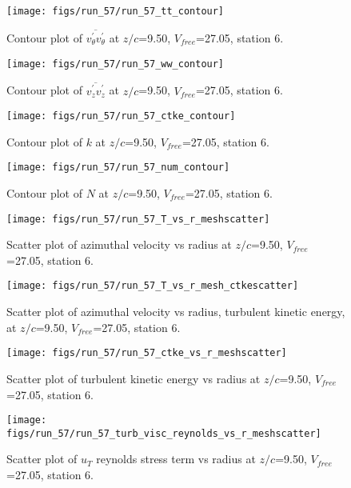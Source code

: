 \begin{figure}[H]
\centering
\texttt{[image: figs/run\_57/run\_57\_tt\_contour]}
\caption{Contour plot of $\overline{v_{\theta}^{\prime} v_{\theta}^{\prime}}$ at $z/c$=9.50, $V_{free}$=27.05, station 6.}
\end{figure}


\begin{figure}[H]
\centering
\texttt{[image: figs/run\_57/run\_57\_ww\_contour]}
\caption{Contour plot of $\overline{v_{z}^{\prime} v_{z}^{\prime}}$ at $z/c$=9.50, $V_{free}$=27.05, station 6.}
\end{figure}


\begin{figure}[H]
\centering
\texttt{[image: figs/run\_57/run\_57\_ctke\_contour]}
\caption{Contour plot of $k$ at $z/c$=9.50, $V_{free}$=27.05, station 6.}
\end{figure}


\begin{figure}[H]
\centering
\texttt{[image: figs/run\_57/run\_57\_num\_contour]}
\caption{Contour plot of $N$ at $z/c$=9.50, $V_{free}$=27.05, station 6.}
\end{figure}


\begin{figure}[H]
\centering
\texttt{[image: figs/run\_57/run\_57\_T\_vs\_r\_meshscatter]}
\caption{Scatter plot of azimuthal velocity vs radius at $z/c$=9.50, $V_{free}$=27.05, station 6.}
\end{figure}


\begin{figure}[H]
\centering
\texttt{[image: figs/run\_57/run\_57\_T\_vs\_r\_mesh\_ctkescatter]}
\caption{Scatter plot of azimuthal velocity vs radius, turbulent kinetic energy, at $z/c$=9.50, $V_{free}$=27.05, station 6.}
\end{figure}


\begin{figure}[H]
\centering
\texttt{[image: figs/run\_57/run\_57\_ctke\_vs\_r\_meshscatter]}
\caption{Scatter plot of turbulent kinetic energy vs radius at $z/c$=9.50, $V_{free}$=27.05, station 6.}
\end{figure}


\begin{figure}[H]
\centering
\texttt{[image: figs/run\_57/run\_57\_turb\_visc\_reynolds\_vs\_r\_meshscatter]}
\caption{Scatter plot of $
u_T$ reynolds stress term vs radius at $z/c$=9.50, $V_{free}$=27.05, station 6.}
\end{figure}


